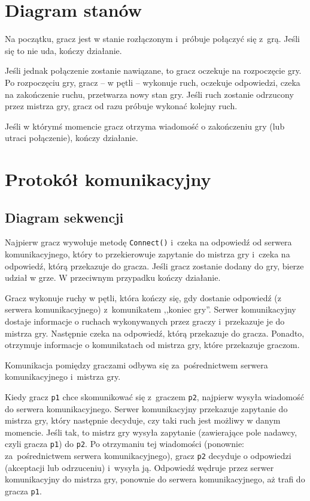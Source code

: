 \documentclass[a4paper]{article}
\newcommand{\code}{\texttt}
\begin{document}
\newpage
\section{Diagram stanów}


Na początku, gracz jest w stanie rozłączonym i~próbuje połączyć się z~grą.
Jeśli się to nie uda, kończy działanie.

Jeśli jednak połączenie zostanie nawiązane, to gracz oczekuje na rozpoczęcie gry.
Po rozpoczęciu gry, gracz -- w pętli -- wykonuje ruch, oczekuje odpowiedzi, czeka na zakończenie ruchu, przetwarza nowy stan gry.
Jeśli ruch zostanie odrzucony przez mistrza gry, gracz od razu próbuje wykonać kolejny ruch.

Jeśli w którymś momencie gracz otrzyma wiadomość o zakończeniu gry (lub utraci połączenie), kończy działanie.

\section{Protokół komunikacyjny}


\subsection{Diagram sekwencji}


Najpierw gracz wywołuje metodę \code{Connect()} i~czeka na odpowiedź od serwera komunikacyjnego, który to przekierowuje zapytanie do mistrza gry i~czeka na odpowiedź, którą przekazuje do gracza.
Jeśli gracz zostanie dodany do gry, bierze udział w grze.
W przeciwnym przypadku kończy działanie.



Gracz wykonuje ruchy w pętli, która kończy się, gdy dostanie odpowiedź (z serwera komunikacyjnego) z~komunikatem ,,koniec gry''.
Serwer komunikacyjny dostaje informacje o ruchach wykonywanych przez graczy i~przekazuje je do mistrza gry.
Następnie czeka na odpowiedź, którą przekazuje do gracza.
Ponadto, otrzymuje informacje o komunikatach od mistrza gry, które przekazuje graczom.



Komunikacja pomiędzy graczami odbywa się za~pośrednictwem serwera komunikacyjnego i~mistrza gry.

Kiedy gracz \code{p1} chce skomunikować się z~graczem \code{p2}, najpierw wysyła wiadomość do serwera komunikacyjnego.
Serwer komunikacyjny przekazuje zapytanie do mistrza gry, który następnie decyduje, czy taki ruch jest możliwy w danym momencie.
Jeśli tak, to mistrz gry wysyła zapytanie (zawierające pole nadawcy, czyli gracza \code{p1}) do \code{p2}.
Po otrzymaniu tej wiadomości (ponownie: za~pośrednictwem serwera komunikacyjnego), gracz \code{p2} decyduje o odpowiedzi (akceptacji lub odrzuceniu) i~wysyła ją. Odpowiedź wędruje przez serwer komunikacyjny do mistrza gry, ponownie do serwera komunikacyjnego, aż trafi do gracza \code{p1}.
\end{document}
